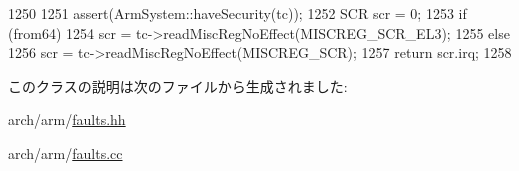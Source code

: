 \begin{DoxyCode}
1250 {
1251     assert(ArmSystem::haveSecurity(tc));
1252     SCR scr = 0;
1253     if (from64)
1254         scr = tc->readMiscRegNoEffect(MISCREG_SCR_EL3);
1255     else
1256         scr = tc->readMiscRegNoEffect(MISCREG_SCR);
1257     return scr.irq;
1258 }
\end{DoxyCode}


このクラスの説明は次のファイルから生成されました:\begin{DoxyCompactItemize}
\item 
arch/arm/\hyperlink{arch_2arm_2faults_8hh}{faults.hh}\item 
arch/arm/\hyperlink{arch_2arm_2faults_8cc}{faults.cc}\end{DoxyCompactItemize}
